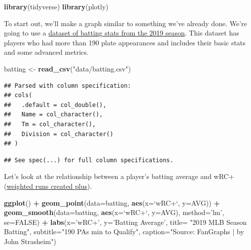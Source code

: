 \documentclass[
]{book}
\newenvironment{Shaded}{\begin{snugshade}}{\end{snugshade}}
\newcommand{\DataTypeTok}[1]{\textcolor[rgb]{0.13,0.29,0.53}{#1}}
\newcommand{\KeywordTok}[1]{\textcolor[rgb]{0.13,0.29,0.53}{\textbf{#1}}}
\newcommand{\NormalTok}[1]{#1}
\newcommand{\OperatorTok}[1]{\textcolor[rgb]{0.81,0.36,0.00}{\textbf{#1}}}
\newcommand{\OtherTok}[1]{\textcolor[rgb]{0.56,0.35,0.01}{#1}}
\newcommand{\StringTok}[1]{\textcolor[rgb]{0.31,0.60,0.02}{#1}}
\begin{document}
\begin{Shaded}
\begin{Highlighting}[]
\KeywordTok{library}\NormalTok{(tidyverse)}
\KeywordTok{library}\NormalTok{(plotly)}
\end{Highlighting}
\end{Shaded}

To start out, we'll make a graph similar to something we've already done. We're going to use a \href{https://unl.box.com/s/xg0eqvmz9ynnegvjabv21ev5qlsd7mjs}{dataset of batting stats from the 2019 season}. This dataset has players who had more than 190 plate appearances and includes their basic stats and some advanced metrics.

\begin{Shaded}
\begin{Highlighting}[]
\NormalTok{batting <-}\StringTok{ }\KeywordTok{read_csv}\NormalTok{(}\StringTok{"data/batting.csv"}\NormalTok{)}
\end{Highlighting}
\end{Shaded}

\begin{verbatim}
## Parsed with column specification:
## cols(
##   .default = col_double(),
##   Name = col_character(),
##   Tm = col_character(),
##   Division = col_character()
## )
\end{verbatim}

\begin{verbatim}
## See spec(...) for full column specifications.
\end{verbatim}

Let's look at the relationship between a player's batting average and wRC+ (\href{http://m.mlb.com/glossary/advanced-stats/weighted-runs-created-plus}{weighted runs created plus}).

\begin{Shaded}
\begin{Highlighting}[]
\KeywordTok{ggplot}\NormalTok{() }\OperatorTok{+}
\StringTok{  }\KeywordTok{geom_point}\NormalTok{(}\DataTypeTok{data=}\NormalTok{batting, }\KeywordTok{aes}\NormalTok{(}\DataTypeTok{x=}\StringTok{`}\DataTypeTok{wRC+}\StringTok{`}\NormalTok{, }\DataTypeTok{y=}\NormalTok{AVG)) }\OperatorTok{+}
\StringTok{  }\KeywordTok{geom_smooth}\NormalTok{(}\DataTypeTok{data=}\NormalTok{batting, }\KeywordTok{aes}\NormalTok{(}\DataTypeTok{x=}\StringTok{`}\DataTypeTok{wRC+}\StringTok{`}\NormalTok{, }\DataTypeTok{y=}\NormalTok{AVG), }\DataTypeTok{method=}\StringTok{'lm'}\NormalTok{, }\DataTypeTok{se=}\OtherTok{FALSE}\NormalTok{) }\OperatorTok{+}
\StringTok{  }\KeywordTok{labs}\NormalTok{(}\DataTypeTok{x=}\StringTok{'wRC+'}\NormalTok{, }\DataTypeTok{y=}\StringTok{'Batting Average'}\NormalTok{, }\DataTypeTok{title=} \StringTok{"2019 MLB Season Batting"}\NormalTok{, }\DataTypeTok{subtitle=}\StringTok{"190 PAs min to Qualify"}\NormalTok{, }\DataTypeTok{caption=}\StringTok{"Source:  FanGraphs | by John Strasheim"}\NormalTok{)}
\end{Highlighting}
\end{Shaded}
\end{document}
